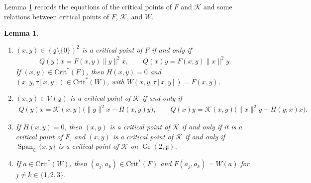 \documentclass[leqno,10pt]{amsart}
\newtheorem{lemma}[theorem]{Lemma}%
\theoremstyle{definition}
\numberwithin{equation}{section}
\newcommand{\grass}{\operatorname{Gr}}
\newcommand{\sect}{\mathscr{K}}
\newcommand{\spn}{\operatorname{Span}}
\newcommand{\g}{\mathfrak{g}}
\newcommand{\stiefel}{\mathscr{V}}
\newcommand{\com}{\mathbb C}
\newcommand{\crtnt}{\mathrm{Crit}^*}
\newcommand{\norm}[1]{\lVert #1\rVert}
\newcommand{\qad}{Q}
\begin{document}
Lemma \ref{lem:critFK} records the equations of the critical points of $F$ and $\sect$ and some relations between critical points of $F$, $\sect$, and $W$.
\begin{lemma}\label{lem:critFK}
\leavevmode\noindent
\begin{enumerate}[label=(\arabic*), ref=(\arabic*)]
\item\label{critF} $(x, y) \in (\g \setminus \{0\})^{2}$ is a critical point of $F$ if and only if 
\begin{align}\label{eq:F}
\qad(y)x = F(x,y)\norm{y}^2 x, \qquad \qad(x)y = F(x,y)\norm{x}^2 y .
\end{align}
If $(x,y)\in\crtnt(F)$, then $H(x, y) = 0$ and $(x,y,\tau[x,y])\in\crtnt(W)$, with $W(x,y,\tau[x,y])=F(x,y)$.
\item\label{critK} $(x, y) \in \stiefel(\g)$ is a critical point of $\sect$ if and only if
\begin{align}\label{eq:K}
\qad(y)x = \sect(x, y)\big(\norm{y}^{2}x - H(x, y)y\big), \qquad \qad(x)y = \sect(x, y)\big(\norm{x}^{2}y - H(y, x)x\big).
\end{align}
\item\label{corr3} If $H(x, y) = 0$, then $(x, y)$ is a critical point of $\sect$ if and only if it is a critical point of $F$, and $(x, y)$ is a critical point of $\sect$ if and only if $\spn_{\com}\{x, y\}$ is a critical point of $\sect$ on $\grass(2, \g)$.
\item\label{corr2} If $a \in\crtnt(W)$, then $(a_{j}, a_{k})\in\crtnt(F)$ and $F(a_{j}, a_{k}) = W(a)$ for $j \neq k \in \{1, 2, 3\}$.
\end{enumerate}
\end{lemma}
\end{document}
